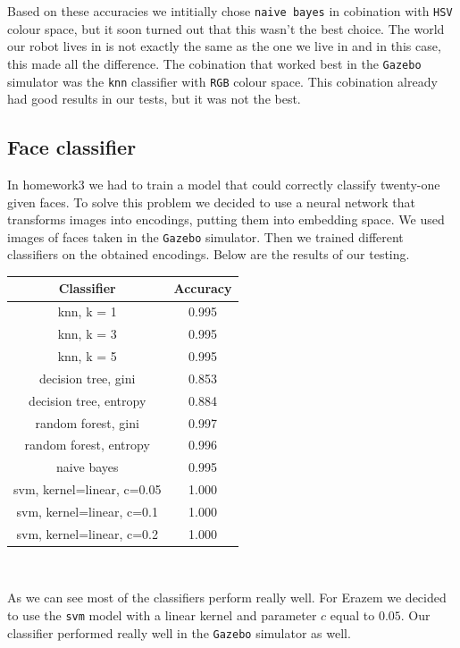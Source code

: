 \documentclass[12pt,a4paper]{article}
\begin{document}
	Based on these accuracies we intitially chose \texttt{naive bayes} in cobination with \texttt{HSV} colour space, but it soon turned out that this wasn't the best choice. The world our robot lives in is not exactly the same as the one we live in and in this case, this made all the difference. The cobination that worked best in the \texttt{Gazebo} simulator was the \texttt{knn} classifier with \texttt{RGB} colour space. This cobination already had good results in our tests, but it was not the best. \\

	\subsection{Face classifier}
	In homework3 we had to train a model that could correctly classify twenty-one given faces. To solve this problem we decided to use a neural network that transforms images into encodings, putting them into embedding space. We used images of faces taken in the \texttt{Gazebo} simulator. Then we trained different classifiers on the obtained encodings. Below are the results of our testing. \\

	\begin{center}
		\begin{tabular}{|c|c|}
			\hline 
			Classifier & Accuracy \\ 
			\hline
			knn, k = 1 & 0.995 \\
			knn, k = 3 & 0.995 \\
			knn, k = 5 & 0.995 \\
			decision tree, gini & 0.853 \\
			decision tree, entropy & 0.884 \\
			random forest, gini & 0.997 \\
			random forest, entropy & 0.996 \\
			naive bayes & 0.995 \\
			svm, kernel=linear, c=0.05 & 1.000 \\
			svm, kernel=linear, c=0.1 & 1.000 \\
			svm, kernel=linear, c=0.2 & 1.000 \\
			\hline 
		\end{tabular} \\
	\end{center}

	As we can see most of the classifiers perform really well. For Erazem we decided to use the \texttt{svm} model with a linear kernel and parameter $c$ equal to $0.05$. Our classifier performed really well in the \texttt{Gazebo} simulator as well. \\
\end{document}
